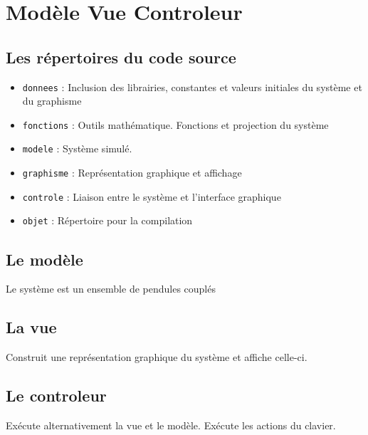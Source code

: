 %
\section{Modèle Vue Controleur}
%
%
\subsection{Les répertoires du code source}
\begin{itemize}[leftmargin=2cm]
\item \texttt{donnees} : Inclusion des librairies, constantes et valeurs initiales du système et du graphisme
\item \texttt{fonctions} : Outils mathématique. Fonctions et projection du système
\item \texttt{modele} : Système simulé. 
\item \texttt{graphisme} : Représentation graphique et affichage
\item \texttt{controle} : Liaison entre le système et l'interface graphique 
\item \texttt{objet} : Répertoire pour la compilation
\end{itemize}
%
\subsection{Le modèle}
Le système est un ensemble de pendules couplés
%
\subsection{La vue}
Construit une représentation graphique du système et affiche celle-ci.
%
\subsection{Le controleur}
Exécute alternativement la vue et le modèle. Exécute les actions du clavier.
%
